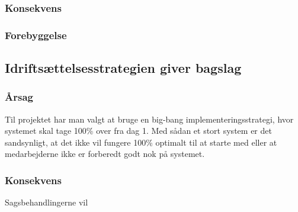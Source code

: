 \documentclass[10pt,a4paper,danish]{article}
\begin{document}
\subsubsection{Konsekvens}

\subsubsection{Forebyggelse}


\subsection{Idriftsættelsesstrategien giver bagslag}
\subsubsection{Årsag}
Til projektet har man valgt at bruge en big-bang implementeringsstrategi, hvor systemet skal tage 100\% over fra dag 1.
Med sådan et stort system er det sandsynligt, at det ikke vil fungere 100\% optimalt til at starte med eller at medarbejderne ikke er forberedt godt nok på systemet.
\subsubsection{Konsekvens}
Sagsbehandlingerne vil 
\end{document}
